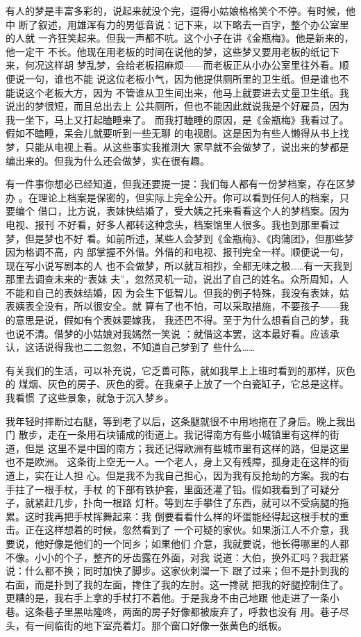 有人的梦是丰富多彩的，说起来就没个完，逗得小姑娘格格笑个不停。有时候，他中
断了叙述，用雄浑有力的男低音说：记下来，以下略去一百字，整个办公室里的人就
一齐狂笑起来。但我一声都不吭。这个小子在讲《金瓶梅》。他是新来的，他一定干
不长。他现在用老板的时间在说他的梦，这些梦又要用老板的纸记下来，何况这样胡
梦乱梦，会给老板招麻烦——而老板正从小办公室里往外看。顺便说一句，谁也不能
说这位老板小气，因为他提供厕所里的卫生纸。但是谁也不能说这个老板大方，因为
不管谁从卫生间出来，他马上就要进去丈量卫生纸。我说出的梦很短，而且总出去上
公共厕所，但也不能因此就说我是个好雇员，因为我一坐下，马上又打起瞌睡来了。
而我打瞌睡的原因，是《金瓶梅》我看过了。假如不瞌睡，呆会儿就要听到一些无聊
的电视剧。这是因为有些人懒得从书上找梦，只能从电视上看。从这些事实我推测大
家早就不会做梦了，说出来的梦都是编出来的。但我为什么还会做梦，实在很有趣。


有一件事你想必已经知道，但我还要提一提：我们每人都有一份梦档案，存在区梦办
。在理论上档案是保密的，但实际上完全公开。你可以看到任何人的档案，只要编个
借口，比方说，表妹快结婚了，受大姨之托来看看这个人的梦档案。因为电视、报刊
不好看，好多人都转这种念头，档案馆里人很多。我也到那里看过梦，但是梦也不好
看。如前所述，某些人会梦到《金瓶梅》、《肉蒲团》，但那些梦因为格调不高，内
部掌握不外借。外借的和电视、报刊完全一样。顺便说一句，现在写小说写剧本的人
也不会做梦，所以就互相抄，全都无味之极……有一天我到那里去调查未来的“表妹
夫”，忽然灵机一动，说出了自己的姓名。众所周知，人不能和自己的表妹结婚，因
为会生下低智儿。但我的例子特殊，我没有表妹，姑表姨表全没有，所以很安全。就
算有了也不怕，可以采取措施，不要孩子——我的意思是说，假如有个表妹要嫁我，
我还巴不得。至于为什么想看自己的梦，我也说不清。借梦的小姑娘对我嫣然一笑说
：就借这本罢，这本最好看。应该承认，这话说得我也二二忽忽，不知道自己梦到了
些什么……

有关我们的生活，可以补充说，它乏善可陈，就如我早上上班时看到的那样，灰色的
煤烟、灰色的房子、灰色的雾。在我桌子上放了一个白瓷缸子，它总是这样。我看惯
了这些景象，就急于沉入梦乡。

我年轻时摔断过右腿，等到老了以后，这条腿就很不中用地拖在了身后。晚上我出门
散步，走在一条用石块铺成的街道上。我记得南方有些小城镇里有这样的街道，但是
这里不是中国的南方；我还记得欧洲有些城市里有这样的路，但是这里也不是欧洲。
这条街上空无一人。一个老人，身上又有残障，孤身走在这样的街道上，实在让人担
心。但是我不为我自己担心，因为我有反抢劫的方案。我的右手拄了一根手杖，手杖
的下部有铁护套，里面还灌了铅。假如我看到了可疑分子，就紧赶几步，扑向一根路
灯杆。等到左手攀住了东西，就可以不受病腿的拖累。这时我再把手杖挥舞起来：我
倒要看看什么样的坏蛋能经得起这根手杖的重击。正在这样想着的时候，忽然看到了
一个可疑的家伙。如果浙江人不介意，我要说，他好像是他们的一个同乡；如果他们
介意，我就要说，他长得哪里的人都不像。小小的个子，整齐的牙齿露在外面，对我
说道：大伯，换外汇吗？我赶紧说：什么都不换；同时加快了脚步。这家伙刺溜一下
跟了过来；但不是扑到我的右面，而是扑到了我的左面，搀住了我的左肘。这一搀就
把我的好腿控制住了。更糟的是，我右手上拿的手杖打不着他。于是我身不由己地跟
他走进了一条小巷。这条巷子里黑咕隆咚，两面的房子好像都被废弃了，呼救也没有
用。巷子尽头，有一间临街的地下室亮着灯。那个窗口好像一张黄色的纸板。

